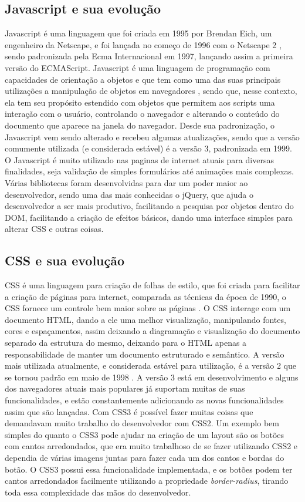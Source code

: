 \subsection{Javascript e sua evolução}

Javascript é uma linguagem que foi criada em 1995 por Brendan Eich,
um engenheiro da Netscape, e foi lançada no começo de 1996 com o
Netscape 2 \cite{mdnjavascript}, sendo padronizada pela Ecma
Internacional em 1997, lançando assim a primeira versão do ECMAScript.
Javascript é uma linguagem de programação com capacidades de orientação a objetos e que tem como uma das suas principais
utilizações a manipulação de objetos em navegadores \cite{flanagan2006javascript}, sendo que, nesse contexto,
ela tem seu propósito estendido com objetos que permitem aos scripts uma interação com o usuário,
controlando o navegador e alterando o conteúdo do documento que aparece na janela do navegador.
Desde sua padronização, o Javascript vem sendo alterado e
recebeu algumas atualizações, sendo que a versão comumente
utilizada (e considerada estável) é a versão 3, padronizada em 1999.
O Javascript é muito utilizado nas paginas de internet atuais para
diversas finalidades, seja validação de simples formulários até
animações mais complexas. Várias bibliotecas foram desenvolvidas para
dar um poder maior ao desenvolvedor, sendo uma das mais conhecidas o
jQuery, que ajuda o desenvolvedor a ser mais produtivo, facilitando a
pesquisa por objetos dentro do DOM, facilitando a criação de efeitos
básicos, dando uma interface simples para alterar CSS e outras coisas.

\subsection{CSS e sua evolução}

CSS é uma linguagem para criação de folhas de estilo, que foi criada
para facilitar a criação de páginas para internet, comparada as técnicas da época de
1990, o CSS fornece um controle bem maior sobre as páginas \cite{schmitt2009css}.
O CSS interage com um documento HTML, dando a ele uma melhor visualização, manipulando
fontes, cores e espaçamentos, assim deixando a diagramação e visualização do documento
separado da estrutura do mesmo, deixando para o HTML apenas a
responsabilidade de manter um documento estruturado e semântico.
A versão mais utilizada atualmente, e considerada estável para utilização, é a versão 2
que se tornou padrão em maio de 1998 \cite{zeldman2009designing}.
A versão 3 está em desenvolvimento e alguns dos navegadores atuais mais populares
já suportam muitas de suas funcionalidades, e estão constantemente
adicionando as novas funcionalidades assim que são lançadas.
Com CSS3 é possível fazer muitas coisas que demandavam muito trabalho
do desenvolvedor com CSS2. Um exemplo bem simples do quanto o CSS3
pode ajudar na criação de um layout são os botões com cantos
arredondados, que era muito trabalhoso de se fazer utilizando CSS2 e
dependia de várias imagens juntas para fazer cada um dos cantos e
bordas do botão. O CSS3 possui essa funcionalidade implementada, e os
botões podem ter cantos arredondados facilmente utilizando a
propriedade \textit{border-radius}, tirando toda essa complexidade das mãos do
desenvolvedor.

